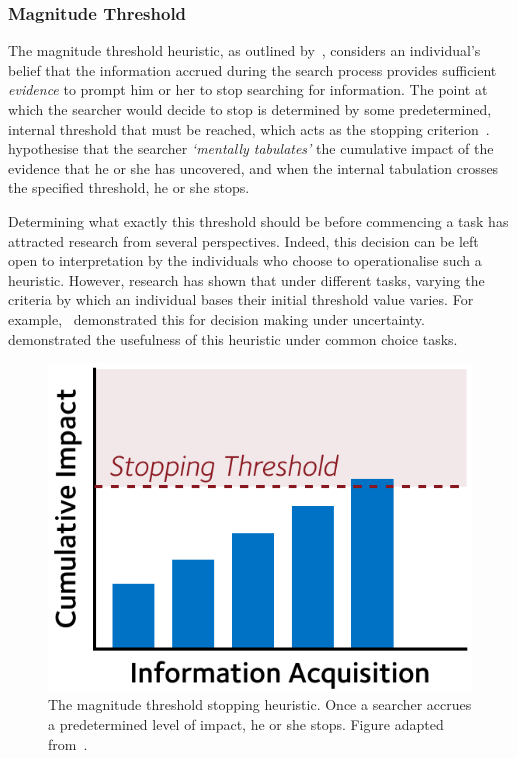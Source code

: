 \subsubsection{Magnitude Threshold}
The magnitude threshold heuristic, as outlined by~\citep{nickles1995judgment}, considers an individual's belief that the information accrued during the search process provides sufficient \emph{evidence} to prompt him or her to stop searching for information. The point at which the searcher would decide to stop is determined by some predetermined, internal threshold that must be reached, which acts as the stopping criterion~\citep{wald1948sequential_analysis, nickles1995judgment}.~\cite{gettys1979hypothesis} hypothesise that the searcher \emph{`mentally tabulates'} the cumulative impact of the evidence that he or she has uncovered, and when the internal tabulation crosses the specified threshold, he or she stops.

Determining what exactly this threshold should be before commencing a task has attracted research from several perspectives. Indeed, this decision can be left open to interpretation by the individuals who choose to operationalise such a heuristic. However, research has shown that under different tasks, varying the criteria by which an individual bases their initial threshold value varies. For example,~\cite{busemeyer1982choice_behaviour} demonstrated this for decision making under uncertainty.~\cite{saad1996stopping} demonstrated the usefulness of this heuristic under common choice tasks.

\begin{figure}
    \begin{center}
    \vspace*{-10mm}
    \includegraphics[width=1\textwidth]{figures/ch3-threshold.pdf}
    \end{center}
    \vspace*{-4mm}
    \caption[The magnitude threshold stopping heuristic]{The magnitude threshold stopping heuristic. Once a searcher accrues a predetermined level of impact, he or she stops. Figure adapted from~\cite{browne2004stopping_rules}.}
    \label{fig:threshold}
\end{figure}

